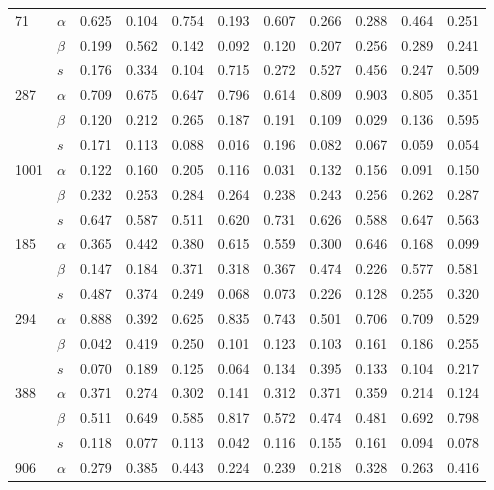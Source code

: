 \begin{longtable}{llrrrrrrrrr}
\cline{1-11}
\multirow{3}{*}{71} & $\alpha$ & 0.625 & 0.104 & 0.754 & 0.193 & 0.607 & 0.266 & 0.288 & 0.464 & 0.251 \\
     & $\beta$ & 0.199 & 0.562 & 0.142 & 0.092 & 0.120 & 0.207 & 0.256 & 0.289 & 0.241 \\
     & $s$ & 0.176 & 0.334 & 0.104 & 0.715 & 0.272 & 0.527 & 0.456 & 0.247 & 0.509 \\
\cline{1-11}
\multirow{3}{*}{287} & $\alpha$ & 0.709 & 0.675 & 0.647 & 0.796 & 0.614 & 0.809 & 0.903 & 0.805 & 0.351 \\
     & $\beta$ & 0.120 & 0.212 & 0.265 & 0.187 & 0.191 & 0.109 & 0.029 & 0.136 & 0.595 \\
     & $s$ & 0.171 & 0.113 & 0.088 & 0.016 & 0.196 & 0.082 & 0.067 & 0.059 & 0.054 \\
\cline{1-11}
\multirow{3}{*}{1001} & $\alpha$ & 0.122 & 0.160 & 0.205 & 0.116 & 0.031 & 0.132 & 0.156 & 0.091 & 0.150 \\
     & $\beta$ & 0.232 & 0.253 & 0.284 & 0.264 & 0.238 & 0.243 & 0.256 & 0.262 & 0.287 \\
     & $s$ & 0.647 & 0.587 & 0.511 & 0.620 & 0.731 & 0.626 & 0.588 & 0.647 & 0.563 \\
\cline{1-11}
\multirow{3}{*}{185} & $\alpha$ & 0.365 & 0.442 & 0.380 & 0.615 & 0.559 & 0.300 & 0.646 & 0.168 & 0.099 \\
     & $\beta$ & 0.147 & 0.184 & 0.371 & 0.318 & 0.367 & 0.474 & 0.226 & 0.577 & 0.581 \\
     & $s$ & 0.487 & 0.374 & 0.249 & 0.068 & 0.073 & 0.226 & 0.128 & 0.255 & 0.320 \\
\cline{1-11}
\multirow{3}{*}{294} & $\alpha$ & 0.888 & 0.392 & 0.625 & 0.835 & 0.743 & 0.501 & 0.706 & 0.709 & 0.529 \\
     & $\beta$ & 0.042 & 0.419 & 0.250 & 0.101 & 0.123 & 0.103 & 0.161 & 0.186 & 0.255 \\
     & $s$ & 0.070 & 0.189 & 0.125 & 0.064 & 0.134 & 0.395 & 0.133 & 0.104 & 0.217 \\
\cline{1-11}
\multirow{3}{*}{388} & $\alpha$ & 0.371 & 0.274 & 0.302 & 0.141 & 0.312 & 0.371 & 0.359 & 0.214 & 0.124 \\
     & $\beta$ & 0.511 & 0.649 & 0.585 & 0.817 & 0.572 & 0.474 & 0.481 & 0.692 & 0.798 \\
     & $s$ & 0.118 & 0.077 & 0.113 & 0.042 & 0.116 & 0.155 & 0.161 & 0.094 & 0.078 \\
\cline{1-11}
\multirow{3}{*}{906} & $\alpha$ & 0.279 & 0.385 & 0.443 & 0.224 & 0.239 & 0.218 & 0.328 & 0.263 & 0.416 \\

\end{longtable}
